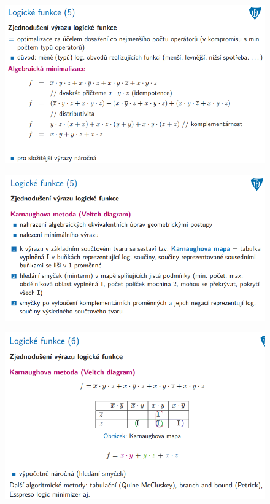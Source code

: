 \documentclass[10pt,a4paper]{article}
\begin{document}
\begin{figure} [h]
	\includegraphics[scale=0.65]{img/prvni_odstavec/otazka2/logicke_funkce5.png}	
\end{figure}

\begin{figure} [h]
	\includegraphics[scale=0.65]{img/prvni_odstavec/otazka2/logicke_funkce6.png}	
\end{figure}

\begin{figure} [h]
	\includegraphics[scale=0.65]{img/prvni_odstavec/otazka2/logicke_funkce7.png}	
\end{figure}
\end{document}
